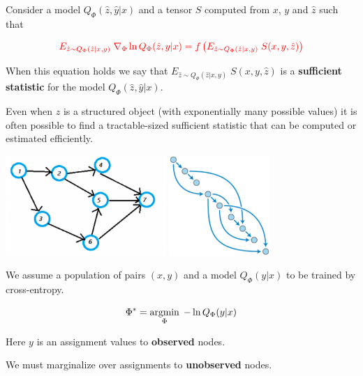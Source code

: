 {Consider a model $Q_\Phi(\hat{z},\hat{y}|x)$ and a tensor $S$ computed from $x$, $y$ and $\hat{z}$ such that

\vfill
$${\color{red} E_{\hat{z} \sim Q_\Phi(\hat{z}|x,y)}\;\nabla_\Phi \ln Q_\Phi(\hat{z},y|x) = f\left(E_{\hat{z} \sim Q_\Phi(\hat{z}|x,y)}\;S(x,y,\hat{z})\right)}$$

\vfill
When this equation holds we say that $E_{\hat{z} \sim Q_\Phi(\hat{z}|x,y)}\;S(x,y,\hat{z})$ is a {\bf sufficient statistic} for the model
$Q_\Phi(\hat{z},\hat{y}|x)$.

\vfill
Even when $\hat{z}$ is a structured object (with exponentially many possible values) it is often possible to find a tractable-sized
sufficient statistic that can be computed or estimated efficiently.



\centerline{\includegraphics[height=1.5in]{../images/DAG} \hspace{1in} \includegraphics[height=1.5in]{../images/SortedDAG}}

\vfill
We assume a population of pairs $(x,y)$ and a model $Q_\Phi(y|x)$ to be trained by cross-entropy.

\vfill
$$\Phi^* = \operatorname*{argmin}_\Phi \;- \ln Q_\Phi(y|x)$$

\vfill
Here $y$ is an assignment values to {\bf observed} nodes.

\vfill
We must marginalize over assignments to {\bf unobserved} nodes.


}
